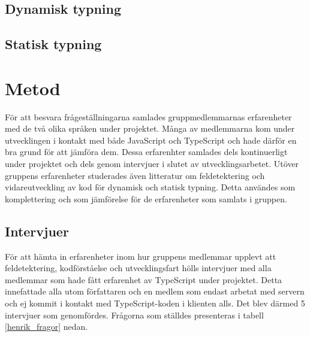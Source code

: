 \subsection{Dynamisk typning}
\subsection{Statisk typning}
\section{Metod}
För att besvara frågeställningarna samlades gruppmedlemmarnas erfarenheter med de två olika språken under projektet. Många av medlemmarna kom under utvecklingen i kontakt med både JavaScript och TypeScript och hade därför en bra grund för att jämföra dem. Dessa erfarenhter samlades dels kontinuerligt under projektet och dels genom intervjuer i slutet av utvecklingsarbetet. Utöver gruppens erfarenheter studerades även litteratur om feldetektering och vidareutveckling av kod för dynamisk och statisk typning. Detta användes som komplettering och som jämförelse för de erfarenheter som samlats i gruppen.
\subsection{Intervjuer}
För att hämta in erfarenheter inom hur gruppens medlemmar upplevt att feldetektering, kodförståelse och utvecklingsfart hölls intervjuer med alla medlemmar som hade fått erfarenhet av TypeScript under projektet. Detta innefattade alla utom författaren och en medlem som endast arbetat med servern och ej kommit i kontakt med TypeScript-koden i klienten alls. Det blev därmed 5 intervjuer som genomfördes. Frågorna som ställdes presenteras i tabell \ref{henrik_fragor} nedan.

